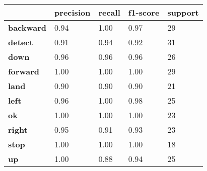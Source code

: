 \begin{table}[h]
    \centering
    \begin{tabular}{|lllll|}
        \hline
        \multicolumn{1}{|l|}{\textbf{}}             & \multicolumn{1}{l|}{\textbf{precision}} & \multicolumn{1}{l|}{\textbf{recall}} & \multicolumn{1}{l|}{\textbf{f1-score}} & \textbf{support} \\ \hline
        \multicolumn{1}{|l|}{\textbf{backward}}     & \multicolumn{1}{l|}{0.94}               & \multicolumn{1}{l|}{1.00}            & \multicolumn{1}{l|}{0.97}              & 29               \\ \hline
        \multicolumn{1}{|l|}{\textbf{detect}}       & \multicolumn{1}{l|}{0.91}               & \multicolumn{1}{l|}{0.94}            & \multicolumn{1}{l|}{0.92}              & 31               \\ \hline
        \multicolumn{1}{|l|}{\textbf{down}}         & \multicolumn{1}{l|}{0.96}               & \multicolumn{1}{l|}{0.96}            & \multicolumn{1}{l|}{0.96}              & 26               \\ \hline
        \multicolumn{1}{|l|}{\textbf{forward}}      & \multicolumn{1}{l|}{1.00}               & \multicolumn{1}{l|}{1.00}            & \multicolumn{1}{l|}{1.00}              & 29               \\ \hline
        \multicolumn{1}{|l|}{\textbf{land}}         & \multicolumn{1}{l|}{0.90}               & \multicolumn{1}{l|}{0.90}            & \multicolumn{1}{l|}{0.90}              & 21               \\ \hline
        \multicolumn{1}{|l|}{\textbf{left}}         & \multicolumn{1}{l|}{0.96}               & \multicolumn{1}{l|}{1.00}            & \multicolumn{1}{l|}{0.98}              & 25               \\ \hline
        \multicolumn{1}{|l|}{\textbf{ok}}           & \multicolumn{1}{l|}{1.00}               & \multicolumn{1}{l|}{1.00}            & \multicolumn{1}{l|}{1.00}              & 23               \\ \hline
        \multicolumn{1}{|l|}{\textbf{right}}        & \multicolumn{1}{l|}{0.95}               & \multicolumn{1}{l|}{0.91}            & \multicolumn{1}{l|}{0.93}              & 23               \\ \hline
        \multicolumn{1}{|l|}{\textbf{stop}}         & \multicolumn{1}{l|}{1.00}               & \multicolumn{1}{l|}{1.00}            & \multicolumn{1}{l|}{1.00}              & 18               \\ \hline
        \multicolumn{1}{|l|}{\textbf{up}}           & \multicolumn{1}{l|}{1.00}               & \multicolumn{1}{l|}{0.88}            & \multicolumn{1}{l|}{0.94}              & 25               \\ \hline

\end{tabular}
\end{table}
